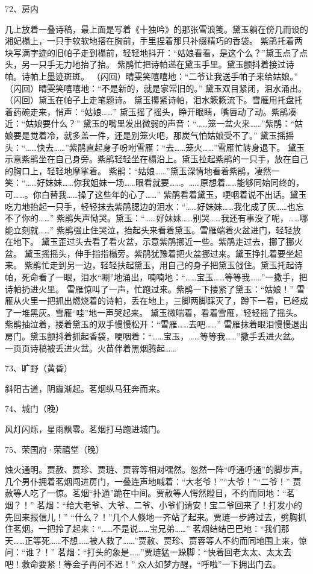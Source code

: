 72、房内\par
几上放着一叠诗稿，最上面是写着《十独吟》的那张雪浪笺。黛玉躺在傍几而设的湘妃榻上，一只手软软地搭在胸前，手里捏着那只补缀精巧的香袋。 
紫鹃托着两块写满字迹的旧帕子走到榻前，轻轻地抖开：“姑娘看看，是这个么？”黛玉点了点头，另一只手无力地抬了抬。 
紫鹃忙把诗帕递在黛玉手里。黛玉颤抖着接过诗帕。诗帕上墨迹斑斑。 
（闪回）晴雯笑嘻嘻地：“二爷让我送手帕子来给姑娘。” 
（闪回）晴雯笑嘻嘻地：“不是新的，就是家常旧的。”
黛玉双目紧闭，泪水涌出。（闪回）黛玉在帕子上走笔题诗。 
黛玉攥紧诗帕，泪水簌簌流下。雪雁用托盘托着药碗走来，悄声：“姑娘……” 
黛玉摇了摇头，睁开眼睛，嘴唇动了动。紫鹃凑近：“姑娘要什么？” 
黛玉的嘴里发出微弱的声音：“……笼一盆火来……”紫鹃：“姑娘要是觉着冷，就多盖一件，还是别笼火吧，那炭气怕姑娘受不了。” 
黛玉摇摇头：“……快去……”紫鹃直起身子吩咐雪雁：“去……笼火……”雪雁忙转身退下。 
黛玉示意紫鹃坐在自己身旁。紫鹃轻轻坐在榻沿上。黛玉拉起紫鹃的一只手，放在自己的胸口上，轻轻地摩挲着。 
紫鹃：“姑娘……”黛玉深情地看着紫鹃，凄然一笑：“……好妹妹……你我姐妹一场……眼看就要……。……原想着……能够同始同终的，可……。你白替我……操了这些年的心了……” 
紫鹃看着黛玉，哽咽着说不出话。黛玉吃力地抬起一只手，轻轻抹去紫鹃腮边的泪水：“……好妹妹……我化成了灰……也忘不了你的……” 
紫鹃失声恸哭。黛玉：“……好妹妹……别哭……我还有事没了呢，……哪能立刻就……” 
紫鹃强止住哭泣，抬起头来看着黛玉。雪雁端着火盆进门，轻轻放在地下。 
黛玉歪过头去看了看火盆，示意紫鹃挪近一些。紫鹃走过去，挪了挪火盆。 
黛玉摇摇头，伸手指指榻旁。紫鹃犹豫着把火盆挪过来。黛玉挣扎着要坐起来。 
紫鹃忙走到另一边，轻轻扶起黛玉，用自己的身子把黛玉戗住。黛玉托起诗帕，死命看了一眼，泪水“唰”地涌出，喃喃地：“……宝玉……等等我……”一撒手，把诗帕扔进火里。 
雪雁惊叫了一声，忙跑过来。紫鹃一下搂紧了黛玉：“姑娘！” 
雪雁从火里一把抓出燃烧着的诗帕，丢在地上，三脚两脚踩灭了，蹲下一看，已经成了一堆黑灰。雪雁“哇”地一声哭起来。 
黛玉微喘着，看着雪雁，轻轻摇了摇头。紫鹃抽泣着，搂着黛玉的双手慢慢松开：“雪雁……去吧……” 
雪雁抹着眼泪慢慢退出房门。黛玉颤抖着抓起香袋，哽咽着：“……宝玉，……等等我……”撒手丢进火盆。 
一页页诗稿被丢进火盆。火苗伴着黑烟腾起…… 

73、旷野（黄昏）\par 
斜阳古道，阴霾渐起。茗烟纵马狂奔而来。 

74、城门（晚）\par 
风灯闪烁，星雨飘零。茗烟打马跑进城门。 

75、荣国府·荣禧堂（晚）\par
烛火通明。贾赦、贾珍、贾琏、贾蓉等相对嘿然。忽然一阵“呼通呼通”的脚步声。 
几个男仆拥着茗烟闯进房门，一叠连声地喊着：“大老爷！”“大爷！”“二爷！” 
贾赦等人吃了一惊。茗烟“扑通”跪在中间。贾赦等人愕然瞠目，不约而同地：“茗烟？！” 
茗烟：“给大老爷、大爷、二爷、小爷们请安！宝二爷回来了！打发小的先回来报信儿！” 
“什么？！”几个人倏地一齐站了起来。贾琏一步跨过去，劈胸抓住茗烟，一把拎了起来：“……不是说……宝兄弟……” 
茗烟结结巴巴地：“我们那天……正等死……不想……被人救了……”贾赦、贾珍、贾蓉等人不约而同地围上来，惊问：“谁？！” 
茗烟：“打头的象是……”贾琏猛一跺脚：“快着回老太太、太太去吧！救命要紧！等会子再问不迟！” 
众人如梦方醒，“呼啦”一下拥出门去。 

